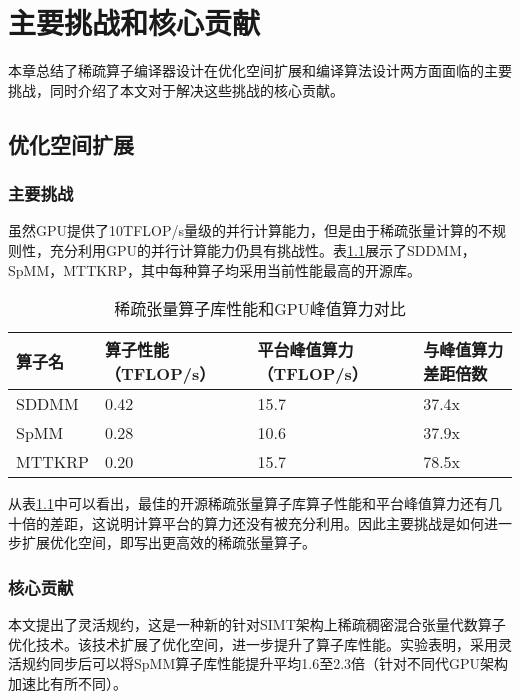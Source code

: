 
\chapter{主要挑战和核心贡献}
本章总结了稀疏算子编译器设计在优化空间扩展和编译算法设计两方面面临的主要挑战，同时介绍了本文对于解决这些挑战的核心贡献。
\section{优化空间扩展}
\subsection{主要挑战}
虽然GPU提供了10TFLOP/s量级的并行计算能力，但是由于稀疏张量计算的不规则性，充分利用GPU的并行计算能力仍具有挑战性。表\ref{tab:motivation-1}展示了SDDMM\cite{yu2021exploiting}，SpMM\cite{huang2020ge}，MTTKRP\cite{nisa2019mttkrp}，其中每种算子均采用当前性能最高的开源库。
\begin{table}
  \centering
  \caption{稀疏张量算子库性能和GPU峰值算力对比}
  \begin{tabular}{llll}
    \toprule
    算子名  & 算子性能（TFLOP/s） & 平台峰值算力（TFLOP/s） & 与峰值算力差距倍数   \\
    \midrule
    SDDMM  & 0.42 & 15.7 & 37.4x \\
    SpMM   & 0.28 & 10.6 & 37.9x \\
    MTTKRP & 0.20 & 15.7 & 78.5x \\
    \bottomrule
  \end{tabular}
  \label{tab:motivation-1}
\end{table}
从表\ref{tab:motivation-1}中可以看出，最佳的开源稀疏张量算子库算子性能和平台峰值算力还有几十倍的差距，这说明计算平台的算力还没有被充分利用。因此主要挑战是如何进一步扩展优化空间，即写出更高效的稀疏张量算子。
\subsection{核心贡献}
本文提出了灵活规约，这是一种新的针对SIMT架构上稀疏稠密混合张量代数算子优化技术。该技术扩展了优化空间，进一步提升了算子库性能。实验表明，采用灵活规约同步后可以将SpMM算子库性能提升平均1.6至2.3倍（针对不同代GPU架构加速比有所不同）。
